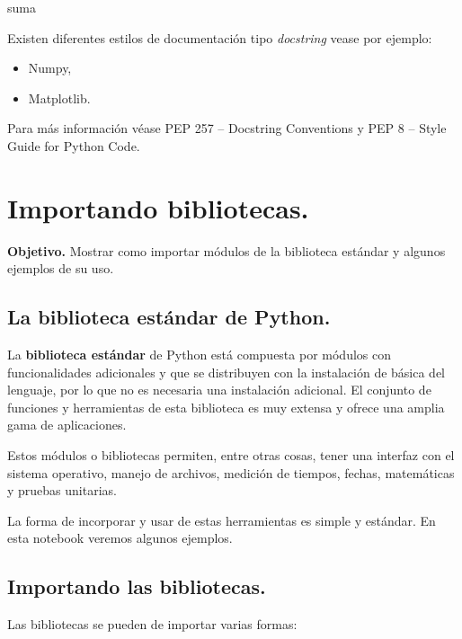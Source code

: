 \documentclass[
  spanish,
  letterpaper,
]{scrbook}
\newenvironment{Shaded}{\begin{snugshade}}{\end{snugshade}}
\newcommand{\NormalTok}[1]{\textcolor[rgb]{0.00,0.23,0.31}{#1}}
\providecommand{\tightlist}{%
  \setlength{\itemsep}{0pt}\setlength{\parskip}{0pt}}
\theoremstyle{definition}
\theoremstyle{remark}
\begin{document}
\begin{Shaded}
\begin{Highlighting}[]
\NormalTok{suma}
\end{Highlighting}
\end{Shaded}

Existen diferentes estilos de documentación tipo \emph{docstring} vease
por ejemplo:

\begin{itemize}
\tightlist
\item
  Numpy,
\item
  Matplotlib.
\end{itemize}

Para más información véase PEP 257 -- Docstring Conventions y PEP 8 --
Style Guide for Python Code.

\chapter{Importando bibliotecas.}\label{sec-w-import}

\textbf{Objetivo.} Mostrar como importar módulos de la biblioteca
estándar y algunos ejemplos de su uso.

\section{La biblioteca estándar de
Python.}\label{sec-biblioteca_estandar}

La \textbf{biblioteca estándar} de Python está compuesta por módulos con
funcionalidades adicionales y que se distribuyen con la instalación de
básica del lenguaje, por lo que no es necesaria una instalación
adicional. El conjunto de funciones y herramientas de esta biblioteca es
muy extensa y ofrece una amplia gama de aplicaciones.

Estos módulos o bibliotecas permiten, entre otras cosas, tener una
interfaz con el sistema operativo, manejo de archivos, medición de
tiempos, fechas, matemáticas y pruebas unitarias.

La forma de incorporar y usar de estas herramientas es simple y
estándar. En esta notebook veremos algunos ejemplos.

\section{Importando las bibliotecas.}\label{sec-import}

Las bibliotecas se pueden de importar varias formas:
\end{document}
